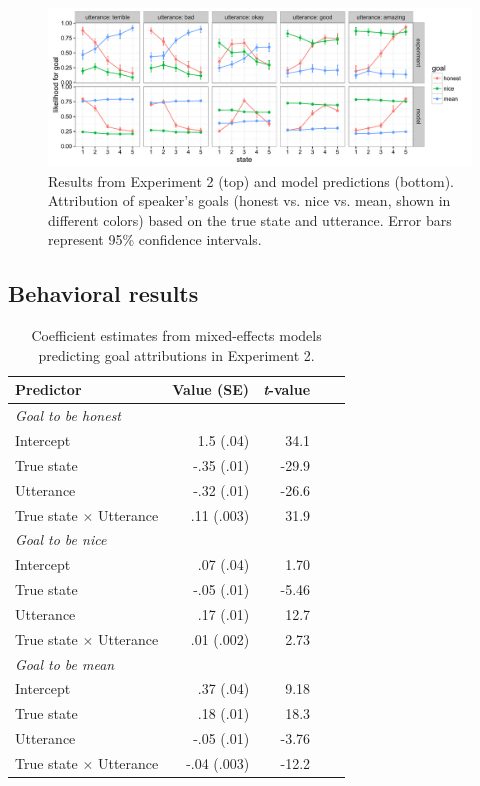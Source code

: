 \documentclass[10pt,letterpaper]{article}
\begin{document}
\begin{figure}[t]
\begin{center} 
  \includegraphics[width=.9\textwidth]{figures/exp2.pdf}
  \caption{\label{fig:exp2} Results from Experiment 2 (top) and model predictions (bottom). Attribution of speaker's goals (honest vs. nice vs. mean, shown in different colors) based on the true state and utterance. Error bars represent 95\% confidence intervals.}
  \end{center} 
\end{figure}

\subsection{Behavioral results}

\begin{table}[t]
\caption{\label{tab:lmer1}  Coefficient estimates from mixed-effects models predicting goal attributions in Experiment 2.} 
\begin{center} 
\begin{tabular}{l r r r l} 
\hline
Predictor  &  Value (SE) & \emph{t}-value\\
\hline
\emph{Goal to be honest} \\
Intercept  & 1.5 (.04) & 34.1 \\
True state & -.35 (.01) &  -29.9 \\
Utterance & -.32 (.01) & -26.6 \\
True state $\times$ Utterance & .11 (.003) & 31.9 \\
\emph{Goal to be nice} \\
Intercept  & .07 (.04) & 1.70\\
True state & -.05 (.01) &  -5.46 \\
Utterance & .17 (.01) & 12.7 \\
True state $\times$ Utterance & .01 (.002) & 2.73 \\
\emph{Goal to be mean} \\ 
Intercept  & .37 (.04) & 9.18 \\
True state & .18 (.01) &  18.3 \\
Utterance & -.05 (.01) & -3.76 \\
True state $\times$ Utterance & -.04 (.003) & -12.2 \\
\hline
\end{tabular} 
\end{center} 
\end{table}
\end{document}
